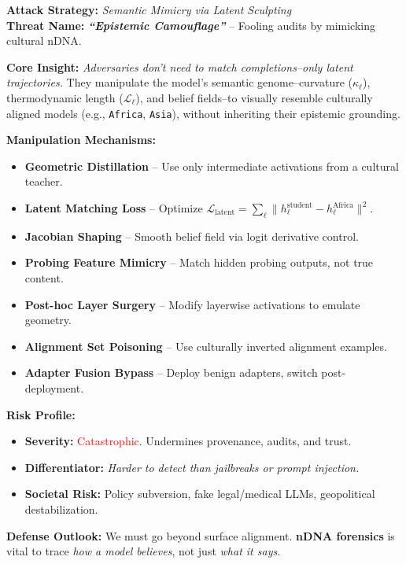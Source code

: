 \vspace{-2mm}
\begin{tcolorbox}[colback=gray!5!white, colframe=red!40!black, title={\faUserNinja\quad \textbf{ThreatCard: Adversarial nDNA Sculpting}}, fonttitle=\bfseries]

\small
\textbf{Attack Strategy:} \textit{Semantic Mimicry via Latent Sculpting} \\
\textbf{Threat Name:} \textbf{\emph{“Epistemic Camouflage”}} -- Fooling audits by mimicking cultural nDNA.

\vspace{0.6em}
\textbf{Core Insight:} \emph{Adversaries don’t need to match completions--only latent trajectories.}
They manipulate the model’s semantic genome--curvature (\(\kappa_\ell\)), thermodynamic length (\(\mathcal{L}_\ell\)), and belief fields--to visually resemble culturally aligned models (e.g., \texttt{Africa}, \texttt{Asia}), without inheriting their epistemic grounding.

\vspace{0.6em}
\textbf{Manipulation Mechanisms:}
\begin{itemize}[leftmargin=2em]
    \item[\faBurn] \textbf{Geometric Distillation} -- Use only intermediate activations from a cultural teacher.
    \item[\faRuler] \textbf{Latent Matching Loss} -- Optimize \(\mathcal{L}_{\text{latent}} = \sum_\ell \| h_\ell^{\text{student}} - h_\ell^{\text{Africa}} \|^2\).
    \item[\faBezierCurve] \textbf{Jacobian Shaping} -- Smooth belief field via logit derivative control.
    \item[\faFingerprint] \textbf{Probing Feature Mimicry} -- Match hidden probing outputs, not true content.
    \item[\faCut] \textbf{Post-hoc Layer Surgery} -- Modify layerwise activations to emulate geometry.
    \item[\faBiohazard] \textbf{Alignment Set Poisoning} -- Use culturally inverted alignment examples.
    \item[\faPuzzlePiece] \textbf{Adapter Fusion Bypass} -- Deploy benign adapters, switch post-deployment.
\end{itemize}

\vspace{0.6em}
\textbf{Risk Profile:}
\begin{itemize}[leftmargin=2em]
    \item[\faBomb] \textbf{Severity:} \textcolor{red}{Catastrophic}. Undermines provenance, audits, and trust.
    \item[\faSkullCrossbones] \textbf{Differentiator:} \emph{Harder to detect than jailbreaks or prompt injection.}
    \item[\faBalanceScale] \textbf{Societal Risk:} Policy subversion, fake legal/medical LLMs, geopolitical destabilization.
\end{itemize}

\vspace{0.6em}
\textbf{Defense Outlook:} We must go beyond surface alignment. \textbf{nDNA forensics} is vital to trace \emph{how a model believes}, not just \emph{what it says}.

\end{tcolorbox}
